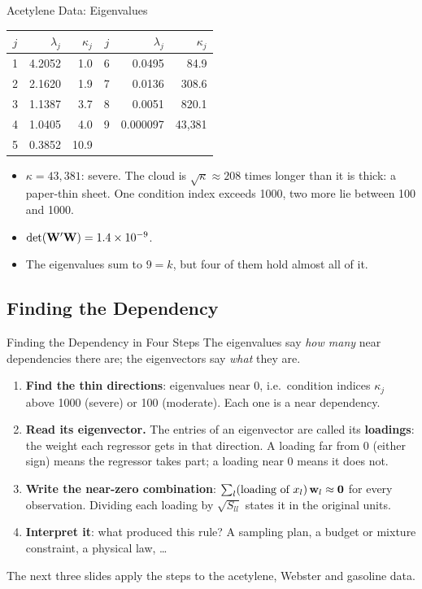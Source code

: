 \begin{frame}{Acetylene Data: Eigenvalues}
    \begin{center}
        \small
        \begin{tabular}{crr@{\qquad}crr}
            \toprule
            $j$ & $\lambda_j$ & $\kappa_j$ & $j$ & $\lambda_j$ & $\kappa_j$ \\
            \midrule
            1 & 4.2052 & 1.0 & 6 & 0.0495 & 84.9 \\
            2 & 2.1620 & 1.9 & 7 & 0.0136 & 308.6 \\
            3 & 1.1387 & 3.7 & 8 & 0.0051 & 820.1 \\
            4 & 1.0405 & 4.0 & 9 & 0.000097 & 43{,}381 \\
            5 & 0.3852 & 10.9 & & & \\
            \bottomrule
        \end{tabular}
    \end{center}
    \begin{itemize}
        \item $\kappa=43{,}381$: severe. The cloud is $\sqrt{\kappa}\approx208$ times longer than it is thick: a paper-thin sheet. One condition index exceeds 1000, two more lie between 100 and 1000.
        \item $\det(\mathbf{W}'\mathbf{W})=1.4\times10^{-9}$.
        \item The eigenvalues sum to $9=k$, but four of them hold almost all of it.
    \end{itemize}
\end{frame}


\subsection{Finding the Dependency}


\begin{frame}{Finding the Dependency in Four Steps}
    \small
    The eigenvalues say \emph{how many} near dependencies there are; the eigenvectors say \emph{what} they are.
    \begin{enumerate}
        \item \textbf{Find the thin directions}: eigenvalues near 0, i.e.\ condition indices $\kappa_j$ above 1000 (severe) or 100 (moderate). Each one is a near dependency.
        \item \textbf{Read its eigenvector.} The entries of an eigenvector are called its \textbf{loadings}: the weight each regressor gets in that direction. A loading far from 0 (either sign) means the regressor takes part; a loading near 0 means it does not.
        \item \textbf{Write the near-zero combination}: $\sum_l(\text{loading of }x_l)\,\mathbf{w}_l\approx\mathbf{0}$ for every observation. Dividing each loading by $\sqrt{S_{ll}}$ states it in the original units.
        \item \textbf{Interpret it}: what produced this rule? A sampling plan, a budget or mixture constraint, a physical law, \dots
    \end{enumerate}
    \svspace{0.3em}
    The next three slides apply the steps to the acetylene, Webster and gasoline data.
\end{frame}


